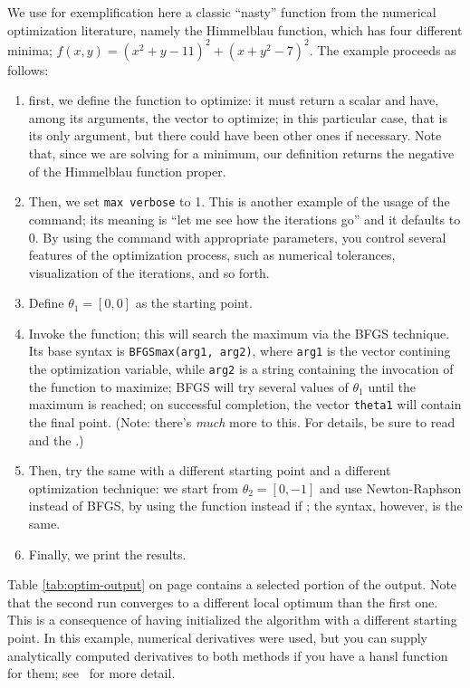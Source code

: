 We use for exemplification here a classic ``nasty'' function from the
numerical optimization literature, namely the Himmelblau function,
which has four different minima; $f(x, y) = (x^2+y-11)^2 +
(x+y^2-7)^2$. The example proceeds as follows:
\begin{enumerate}
\item first, we define the function to optimize: it must return a
  scalar and have, among its arguments, the vector to optimize; in
  this particular case, that is its only argument, but there could
  have been other ones if necessary.  Note that, since we are solving
  for a minimum, our definition returns the negative of the Himmelblau
  function proper.
\item Then, we set \verb|max verbose| to 1. This is another example of
  the usage of the  command; its meaning is ``let me see how
  the iterations go'' and it defaults to 0. By using the 
  command with appropriate parameters, you control several features of
  the optimization process, such as numerical tolerances,
  visualization of the iterations, and so forth.
\item Define $\theta_1 = [0, 0]$ as the starting point.
\item Invoke the  function; this will search the maximum
  via the BFGS technique. Its base syntax is \texttt{BFGSmax(arg1,
    arg2)}, where \texttt{arg1} is the vector contining the
  optimization variable, while \texttt{arg2} is a string containing
  the invocation of the function to maximize; BFGS will try several
  values of $\theta_1$ until the maximum is reached; on successful
  completion, the vector \texttt{theta1} will contain the final
  point. (Note: there's \emph{much} more to this. For details, be sure
  to read \GUG and the \GCR.)
\item Then, try the same with a different starting point and a
  different optimization technique: we start from $\theta_2 = [0, -1]$
  and use Newton-Raphson instead of BFGS, by using the 
  function instead if ; the syntax, however, is the
  same.
\item Finally, we print the results.
\end{enumerate}
Table \ref{tab:optim-output} on page \pageref{tab:optim-output}
contains a selected portion of the output. Note that the second run
converges to a different local optimum than the first one. This is a
consequence of having initialized the algorithm with a different
starting point. In this example, numerical derivatives were used, but
you can supply analytically computed derivatives to both methods if
you have a hansl function for them; see \GUG\ for more detail.

